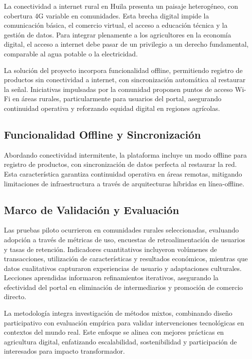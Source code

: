 La conectividad a internet rural en Huila presenta un paisaje heterogéneo, con cobertura 4G variable en comunidades. Esta brecha digital impide la comunicación básica, el comercio virtual, el acceso a educación técnica y la gestión de datos. Para integrar plenamente a los agricultores en la economía digital, el acceso a internet debe pasar de un privilegio a un derecho fundamental, comparable al agua potable o la electricidad.

La solución del proyecto incorpora funcionalidad offline, permitiendo registro de productos sin conectividad a internet, con sincronización automática al restaurar la señal. Iniciativas impulsadas por la comunidad proponen puntos de acceso Wi-Fi en áreas rurales, particularmente para usuarios del portal, asegurando continuidad operativa y reforzando equidad digital en regiones agrícolas.

\subsection{Funcionalidad Offline y Sincronización}
Abordando conectividad intermitente, la plataforma incluye un modo offline para registro de productos, con sincronización de datos perfecta al restaurar la red. Esta característica garantiza continuidad operativa en áreas remotas, mitigando limitaciones de infraestructura a través de arquitecturas híbridas en línea-offline.

\subsection{Marco de Validación y Evaluación}
Las pruebas piloto ocurrieron en comunidades rurales seleccionadas, evaluando adopción a través de métricas de uso, encuestas de retroalimentación de usuarios y tasas de retención. Indicadores cuantitativos incluyeron volúmenes de transacciones, utilización de características y resultados económicos, mientras que datos cualitativos capturaron experiencias de usuario y adaptaciones culturales. Lecciones aprendidas informaron refinamientos iterativos, asegurando la efectividad del portal en eliminación de intermediarios y promoción de comercio directo.

La metodología integra investigación de métodos mixtos, combinando diseño participativo con evaluación empírica para validar intervenciones tecnológicas en contextos del mundo real. Este enfoque se alinea con mejores prácticas en agricultura digital, enfatizando escalabilidad, sostenibilidad y participación de interesados para impacto transformador.

